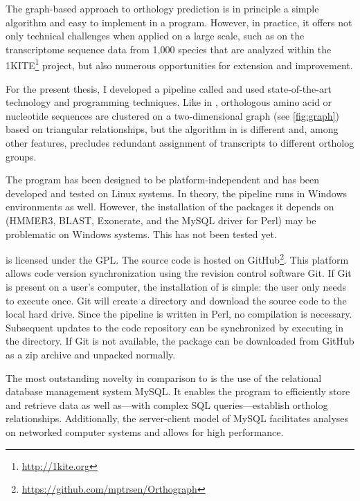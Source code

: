 The graph-based approach to orthology prediction is in principle a simple
algorithm and easy to implement in a program. However, in practice, it offers
not only technical challenges when applied on a large scale, such as on the
transcriptome sequence data from 1,000 species that are analyzed within the
1KITE\footnote{\url{http://1kite.org}} project, but also numerous opportunities
for extension and improvement. 

For the present thesis, I developed a pipeline called \pname and used
state-of-the-art technology and programming techniques. Like in \hamstr,
orthologous amino acid or nucleotide sequences are clustered on a
two-dimensional graph (see \autoref{fig:graph}) based on triangular
relationships, but the algorithm in \pname is different and, among other
features, precludes redundant assignment of transcripts to different ortholog
groups.



The program has been designed to be platform-independent and has been developed
and tested on Linux systems. In theory, the pipeline runs in Windows
environments as well. However, the installation of the packages it depends on
(HMMER3, BLAST, Exonerate, and the MySQL driver for Perl) may be problematic on
Windows systems. This has not been tested yet.

\pname is licensed under the GPL. The source code is hosted on
GitHub\footnote{\url{https://github.com/mptrsen/Orthograph}}. This platform
allows code version synchronization using the revision control software Git. If
Git is present on a user's computer, the installation of \pname is simple: the
user only needs to execute  once. Git will create a directory and
download the source code to the local hard drive. Since the pipeline is written
in Perl, no compilation is necessary. Subsequent updates to the code repository
can be synchronized by executing  in the \pname directory. If Git
is not available, the package can be downloaded from GitHub as a zip archive and
unpacked normally.

The most outstanding novelty in comparison to \hamstr is the use of the
relational database management system MySQL. It enables the program to
efficiently store and retrieve data as well as---with complex SQL
queries---establish ortholog relationships. Additionally, the server-client
model of MySQL facilitates analyses on networked computer systems and allows for
high performance.

